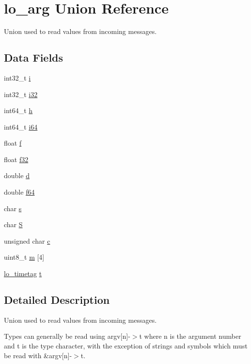 \hypertarget{unionlo__arg}{
\section{lo\_\-arg Union Reference}
\label{unionlo__arg}
}
Union used to read values from incoming messages.  


\subsection*{Data Fields}
\begin{CompactItemize}
\item 
int32\_\-t \hyperlink{unionlo__arg_7eefb9548603ff68b4fbd4c4d41c648b}{i}
\item 
int32\_\-t \hyperlink{unionlo__arg_07e800463dc4ec5066b01033457ca018}{i32}
\item 
int64\_\-t \hyperlink{unionlo__arg_1773bb0e69aa3b137ddc26044334b2b4}{h}
\item 
int64\_\-t \hyperlink{unionlo__arg_fe8046a8395e9af51cc759034ccfedd5}{i64}
\item 
float \hyperlink{unionlo__arg_d61c0f83abb077ce656b3a39d5c7e19f}{f}
\item 
float \hyperlink{unionlo__arg_27ae2540e5e98e85826ccb7350b2ab20}{f32}
\item 
double \hyperlink{unionlo__arg_2a690890222baa5b9971f8772cb02535}{d}
\item 
double \hyperlink{unionlo__arg_bf90442900450bb63d8d9bb4e60af4ee}{f64}
\item 
char \hyperlink{unionlo__arg_15bbcf8284d75ad441b5cde7218548f6}{s}
\item 
char \hyperlink{unionlo__arg_b9c6a9c09ea094d58f889ed1a5edba0b}{S}
\item 
unsigned char \hyperlink{unionlo__arg_a2e1c99864cf46e6b9cc52fb5cb214fe}{c}
\item 
uint8\_\-t \hyperlink{unionlo__arg_96d32df951c54eaff5dc67fc97a70c83}{m} \mbox{[}4\mbox{]}
\item 
\hyperlink{structlo__timetag}{lo\_\-timetag} \hyperlink{unionlo__arg_fc89e5569fba7a660638839366b17408}{t}
\end{CompactItemize}


\subsection{Detailed Description}
Union used to read values from incoming messages. 

Types can generally be read using argv\mbox{[}n\mbox{]}-$>$t where n is the argument number and t is the type character, with the exception of strings and symbols which must be read with \&argv\mbox{[}n\mbox{]}-$>$t. 




